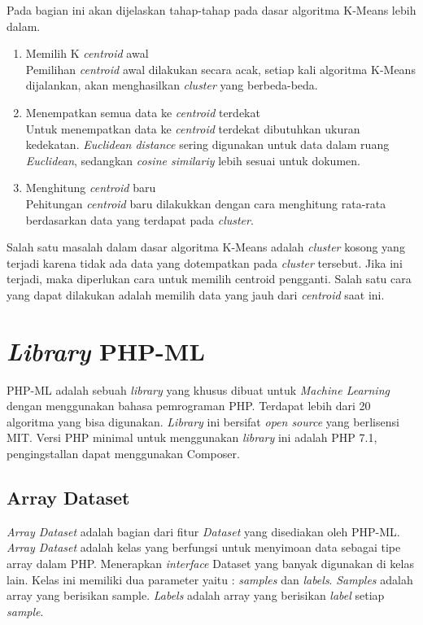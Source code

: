 Pada bagian ini akan dijelaskan tahap-tahap pada dasar algoritma K-Means lebih dalam.

\begin{enumerate}
    \item Memilih K \textit{centroid} awal \\
        Pemilihan \textit{centroid} awal dilakukan secara acak, setiap kali algoritma K-Means dijalankan, akan menghasilkan \textit{cluster} yang berbeda-beda.
        
    \item Menempatkan semua data ke \textit{centroid} terdekat\\
        Untuk menempatkan data ke \textit{centroid} terdekat dibutuhkan ukuran kedekatan. \textit{Euclidean distance} sering digunakan untuk data dalam ruang \textit{Euclidean}, sedangkan \textit{cosine similariy} lebih sesuai untuk dokumen.
            
    \item Menghitung \textit{centroid} baru\\
        Pehitungan \textit{centroid} baru dilakukkan dengan cara menghitung rata-rata berdasarkan data yang terdapat pada \textit{cluster}.
\end{enumerate}

Salah satu masalah dalam dasar algoritma K-Means adalah \textit{cluster} kosong yang terjadi karena tidak ada data yang dotempatkan pada \textit{cluster} tersebut. Jika ini terjadi, maka diperlukan cara untuk memilih centroid pengganti. Salah satu cara yang dapat dilakukan adalah memilih data yang jauh dari \textit{centroid} saat ini.


\section{\textit{Library} PHP-ML}
\label{sec:library php-ml}
PHP-ML adalah sebuah \textit{library} yang khusus dibuat untuk \textit{Machine Learning} dengan menggunakan bahasa pemrograman PHP. Terdapat lebih dari 20 algoritma yang bisa digunakan. \textit{Library} ini bersifat \textit{open source} yang berlisensi MIT. Versi PHP minimal untuk menggunakan \textit{library} ini adalah PHP 7.1, pengingstallan dapat menggunakan Composer.

\subsection{Array Dataset} %
\textit{Array Dataset} adalah bagian dari fitur \textit{Dataset} yang disediakan oleh PHP-ML. \textit{Array Dataset} adalah kelas yang berfungsi untuk menyimoan data sebagai tipe array dalam PHP. Menerapkan \textit{interface} Dataset yang banyak digunakan di kelas lain. Kelas ini memiliki dua parameter yaitu : \textit{samples} dan \textit{labels}. \textit{Samples} adalah array yang berisikan sample. \textit{Labels} adalah array yang berisikan \textit{label} setiap \textit{sample}.

